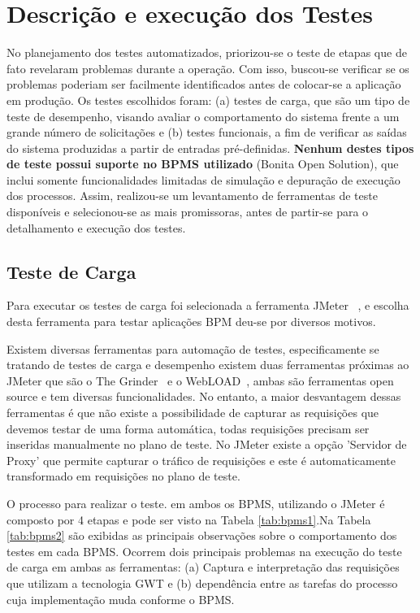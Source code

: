 \documentclass[12pt]{article}
\begin{document}
\section{Descrição e execução dos Testes}

No planejamento dos testes automatizados, priorizou-se o teste de  etapas que de fato revelaram problemas durante a operação. Com isso, buscou-se verificar se os problemas poderiam ser facilmente identificados antes de colocar-se a aplicação em produção. Os testes escolhidos foram: (a) testes de carga, que são um tipo de teste de desempenho, visando avaliar o comportamento do sistema frente a um grande número de solicitações e (b) testes funcionais, a fim de verificar as saídas do sistema produzidas a partir de entradas pré-definidas. \textbf{Nenhum destes tipos de teste possui suporte no BPMS utilizado} (Bonita Open Solution), que inclui somente funcionalidades limitadas de simulação e depuração de execução dos processos. Assim, realizou-se um levantamento de ferramentas de teste disponíveis e selecionou-se as mais promissoras, antes de partir-se para o detalhamento e execução dos testes.

\subsection{Teste de Carga}
Para executar os testes de carga foi selecionada a ferramenta JMeter ~\cite{JMETER}, e escolha desta ferramenta para testar aplicações BPM deu-se por diversos motivos.

Existem diversas ferramentas para automação de testes, especificamente se tratando de testes de carga e desempenho existem duas ferramentas próximas ao JMeter que são o The Grinder~\cite{GRINDER} e o WebLOAD~\cite{WEBLOAD}, ambas são ferramentas open source e tem diversas funcionalidades. No entanto, a maior desvantagem dessas ferramentas é que não existe a possibilidade de capturar as requisições que devemos testar de uma forma automática, todas requisições precisam ser inseridas manualmente no plano de teste. No JMeter existe a opção 'Servidor de Proxy' que permite capturar o tráfico de requisições e este é automaticamente transformado em requisições no plano de teste.

O processo para realizar o teste. em ambos os BPMS, utilizando o JMeter é composto por 4 etapas e pode ser visto na Tabela \ref{tab:bpms1}.Na Tabela \ref{tab:bpms2} são exibidas as principais observações sobre o comportamento dos testes em cada BPMS. Ocorrem dois principais problemas na execução do teste de carga em ambas as ferramentas: (a) Captura e interpretação das requisições que utilizam a tecnologia GWT e (b) dependência entre as tarefas do processo cuja implementação muda conforme o BPMS. 
\end{document}
